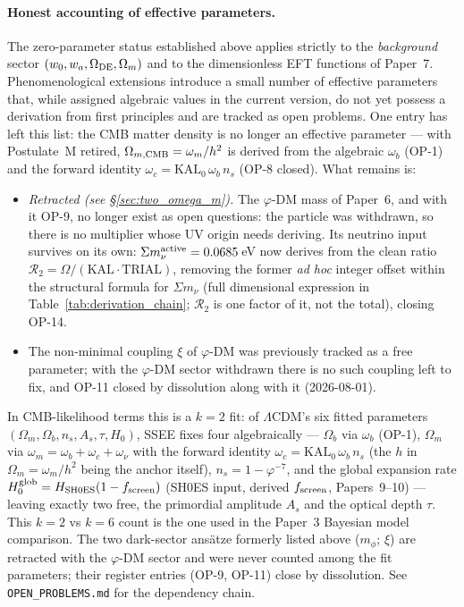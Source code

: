 \documentclass[12pt,a4paper]{article}
\begin{document}
\paragraph{Honest accounting of effective parameters.}
The zero-parameter status established above applies strictly to the
\emph{background} sector $(w_0,w_a,\Omega_{\rm DE},\Omega_m)$ and to
the dimensionless EFT functions of Paper~7. Phenomenological extensions
introduce a small number of effective parameters that, while assigned
algebraic values in the current version, do not yet possess a derivation from
first principles and are tracked as open problems. One entry has left this list:
the CMB matter density is no longer an effective parameter --- with Postulate~M
retired, $\Omega_{m,\rm CMB}=\omega_m/h^2$ is derived from the algebraic
$\omega_b$ (OP-1) and the forward identity
$\omega_c=\mathrm{KAL}_0\,\omega_b\,n_s$ (OP-8 closed). What remains is:
\begin{itemize}\itemsep1pt
  \item \emph{Retracted (see \S\ref{sec:two_omega_m}).} The $\varphi$-DM mass
        of Paper~6, and with it OP-9, no longer exist as open questions: the
        particle was withdrawn, so there is no multiplier whose UV origin needs
        deriving. Its neutrino input survives on its own: 
        $\Sigma m_\nu^{\rm active}=0.0685$\,eV now derives from the clean ratio
        $\mathcal{R}_2=\Omega/(\mathrm{KAL}\cdot\mathrm{TRIAL})$, removing the
        former \emph{ad hoc} integer offset within the structural formula
        for $\Sigma m_\nu$ (full dimensional expression in
        Table~\ref{tab:derivation_chain}; $\mathcal{R}_2$ is one factor of it,
        not the total), closing OP-14.
  \item The non-minimal coupling $\xi$ of $\varphi$-DM was previously tracked
        as a free parameter; with the $\varphi$-DM sector withdrawn there is no
        such coupling left to fix, and OP-11 closed by dissolution along with
        it (2026-08-01).
\end{itemize}
In CMB-likelihood terms this is a $k=2$ fit: of $\Lambda$CDM's six fitted
parameters $(\Omega_m,\Omega_b,n_s,A_s,\tau,H_0)$, SSEE fixes four
algebraically --- $\Omega_b$ via $\omega_b$ (OP-1), $\Omega_m$ via
$\omega_m=\omega_b+\omega_c+\omega_\nu$ with the forward identity
$\omega_c=\mathrm{KAL}_0\,\omega_b\,n_s$ (the $h$ in $\Omega_m=\omega_m/h^2$
being the anchor itself), $n_s=1-\varphi^{-7}$, and the global
expansion rate $H_0^{\rm glob}=H_{\rm SH0ES}(1-f_{\rm screen})$ (SH0ES input, derived $f_{\rm screen}$, Papers~9--10) --- leaving exactly two free,
the primordial amplitude $A_s$ and the optical depth $\tau$. This $k=2$ vs $k=6$
count is the one used in the Paper~3 Bayesian model comparison. The two
dark-sector ans\"atze formerly listed above ($m_\phi$; $\xi$) are retracted with
the $\varphi$-DM sector and were never counted among the fit parameters; their
register entries (OP-9, OP-11) close by dissolution. See \texttt{OPEN\_PROBLEMS.md} for
the dependency chain.
\end{document}
